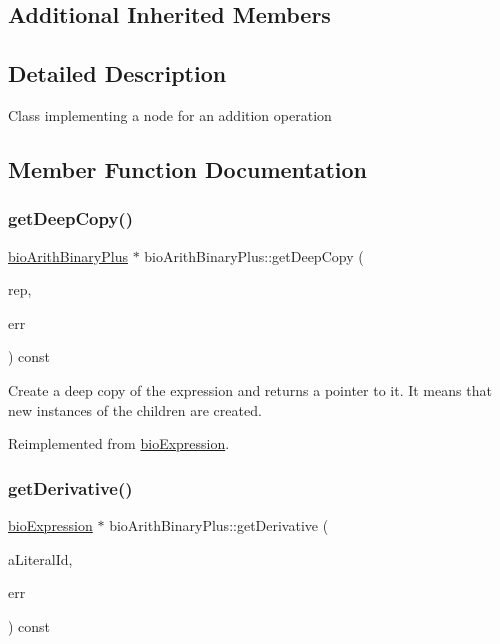 \subsection*{Additional Inherited Members}


\subsection{Detailed Description}
Class implementing a node for an addition operation 

\subsection{Member Function Documentation}
\mbox{\label{classbio_arith_binary_plus_a5ec101b24a6b02bb3fb19803749b3e83}} 
\subsubsection{\texorpdfstring{get\+Deep\+Copy()}{getDeepCopy()}}
{\footnotesize\ttfamily \hyperlink{classbio_arith_binary_plus}{bio\+Arith\+Binary\+Plus} $\ast$ bio\+Arith\+Binary\+Plus\+::get\+Deep\+Copy (\begin{DoxyParamCaption}\item[{\hyperlink{classbio_expression_repository}{bio\+Expression\+Repository} $\ast$}]{rep,  }\item[{pat\+Error $\ast$\&}]{err }\end{DoxyParamCaption}) const\hspace{0.3cm}{\ttfamily [virtual]}}

Create a deep copy of the expression and returns a pointer to it. It means that new instances of the children are created. 

Reimplemented from \hyperlink{classbio_expression_a4ee1b8add634078a02eaae26cd40dcc8}{bio\+Expression}.

\mbox{\label{classbio_arith_binary_plus_a790383068d3be59378a18206199fb3f1}} 
\subsubsection{\texorpdfstring{get\+Derivative()}{getDerivative()}}
{\footnotesize\ttfamily \hyperlink{classbio_expression}{bio\+Expression} $\ast$ bio\+Arith\+Binary\+Plus\+::get\+Derivative (\begin{DoxyParamCaption}\item[{pat\+U\+Long}]{a\+Literal\+Id,  }\item[{pat\+Error $\ast$\&}]{err }\end{DoxyParamCaption}) const\hspace{0.3cm}{\ttfamily [virtual]}}

